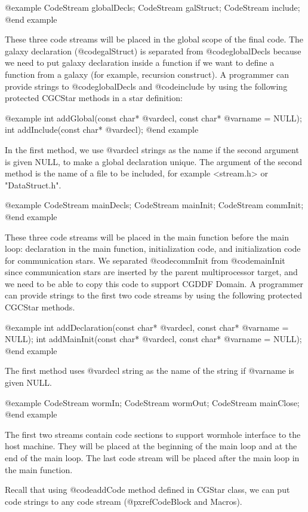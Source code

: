 {@example
CodeStream globalDecls;
CodeStream galStruct;
CodeStream include;
@end example

These three code streams will be placed in the global scope of the final code.
The galaxy declaration (@code{galStruct}) is separated from @code{globalDecls}
because we need to put galaxy declaration inside a function if we want to
define a function from a galaxy (for example, recursion construct).
A programmer can provide strings to @code{globalDecls} and @code{include}
by using the following protected CGCStar methods in a star definition:

@example
int addGlobal(const char* @var{decl}, const char* @var{name} = NULL);
int addInclude(const char* @var{decl});
@end example

In the first method, we use @var{decl} strings as the name if the second
argument is given NULL, to make a global declaration unique.
The argument of the second method is the name of a file to be included, for
example <stream.h> or "DataStruct.h".

@example
CodeStream mainDecls;
CodeStream mainInit;
CodeStream commInit;
@end example

These three code streams will be placed in the main function before the
main loop: declaration in the main function, initialization code, and
initialization code for communication stars. We separated @code{commInit}
from @code{mainInit} since communication stars are inserted by the parent
multiprocessor target, and we need to be able to copy this code to
support CGDDF Domain. A programmer can provide strings to the first
two code streams by using the following protected CGCStar methods.

@example
int addDeclaration(const char* @var{decl}, const char* @var{name} = NULL);
int addMainInit(const char* @var{decl}, const char* @var{name} = NULL);
@end example

The first method uses @var{decl} string as the name of the string if
@var{name} is given NULL.

@example
CodeStream wormIn;
CodeStream wormOut;
CodeStream mainClose;
@end example

The first two streams contain code sections to support wormhole interface
to the host machine. They will be placed at the beginning of the main loop and
at the end of the main loop. The last code stream will be placed after the
main loop in the main function.

Recall that using @code{addCode} method defined in CGStar class, we can
put code strings to any code stream (@pxref{CodeBlock and Macros}).

}
